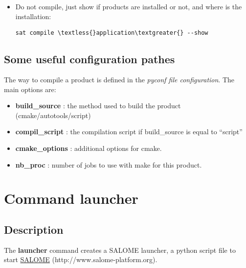 \documentclass[a4paper,10pt,english]{sphinxmanual}
\begin{document}
\begin{itemize}
\begin{Verbatim}[commandchars=\\\{\}]
sat compile \textless{}product\textgreater{} --stop\_first\_fail
\end{Verbatim}

\item {} 
Do not compile, just show if products are installed or not, and where is the installation:

\begin{Verbatim}[commandchars=\\\{\}]
sat compile \textless{}application\textgreater{} --show
\end{Verbatim}

\end{itemize}


\subsection{Some useful configuration pathes}
\label{commands/compile:some-useful-configuration-pathes}
The way to compile a product is defined in the \emph{pyconf file configuration}.
The main options are:
\begin{itemize}
\item {} 
\textbf{build\_source} : the method used to build the product (cmake/autotools/script)

\item {} 
\textbf{compil\_script} : the compilation script if build\_source is equal to ``script''

\item {} 
\textbf{cmake\_options} : additional options for cmake.

\item {} 
\textbf{nb\_proc} : number of jobs to use with make for this product.

\end{itemize}
\clearpage

\section{Command launcher}
\label{commands/launcher:svn}\label{commands/launcher:command-launcher}\label{commands/launcher::doc}

\subsection{Description}
\label{commands/launcher:description}
The \textbf{launcher} command creates a SALOME launcher, a python script file to start \href{http://www.salome-platform.org}{SALOME} (http://www.salome-platform.org).
\end{document}
